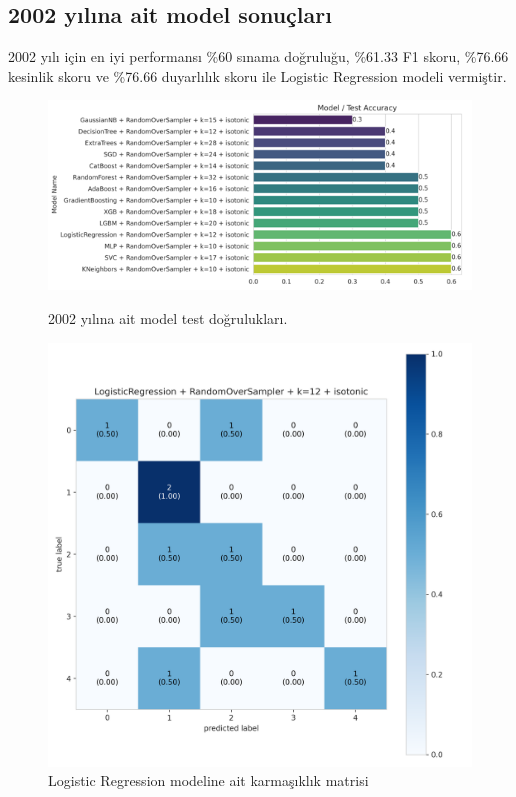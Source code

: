 \newpage

\subsection{2002 yılına ait model sonuçları}
2002 yılı için en iyi performansı \%60 sınama doğruluğu,  \%61.33 F1 skoru, \%76.66 kesinlik skoru ve \%76.66 duyarlılık skoru ile Logistic Regression modeli vermiştir.

\begin{figure}[ht]
\centering
\begin{minipage}[b]{0.6\textwidth}
    \centering
    \includegraphics[width=\textwidth]{2002.png}
    \caption{2002 yılına ait model test doğrulukları.}
    \label{fig:resim1}
\end{minipage}
\hfill
\begin{minipage}[b]{0.6\textwidth}
    \centering
    \includegraphics[width=\textwidth]{2002_cm.png}
    \caption{Logistic Regression modeline ait karmaşıklık matrisi}
    \label{fig:resim2}
\end{minipage}
\end{figure}


